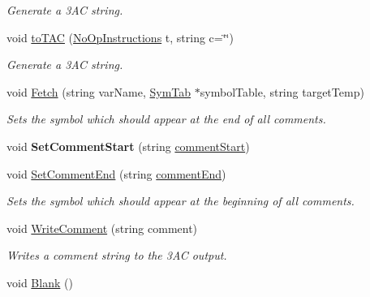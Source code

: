 \begin{DoxyCompactItemize}
\begin{DoxyCompactList}\small\item\em Generate a 3\-A\-C string. \end{DoxyCompactList}\item 
void \hyperlink{classTAC__Generator_a0ee1e11b169a2ead7244c00869d66858}{to\-T\-A\-C} (\hyperlink{classTAC__Generator_a3942f3e280fb83e44ad85eb13d56dfb5}{No\-Op\-Instructions} t, string c=\char`\"{}\char`\"{})
\begin{DoxyCompactList}\small\item\em Generate a 3\-A\-C string. \end{DoxyCompactList}\item 
void \hyperlink{classTAC__Generator_aacf5782b612a76a148478154306d3216}{Fetch} (string var\-Name, \hyperlink{classSymTab}{Sym\-Tab} $\ast$symbol\-Table, string target\-Temp)
\begin{DoxyCompactList}\small\item\em Sets the symbol which should appear at the end of all comments. \end{DoxyCompactList}\item 
\hypertarget{classTAC__Generator_a8570a01bd5bf10e849017d412440799a}{void {\bfseries Set\-Comment\-Start} (string \hyperlink{classTAC__Generator_ac530666b410f226e764e9eb33b2a4666}{comment\-Start})}\label{classTAC__Generator_a8570a01bd5bf10e849017d412440799a}

\item 
void \hyperlink{classTAC__Generator_ad96d5a262c29a34a34324ed6c7aeffe1}{Set\-Comment\-End} (string \hyperlink{classTAC__Generator_a9f011cfb810ea2cd01b31b9a48762123}{comment\-End})
\begin{DoxyCompactList}\small\item\em Sets the symbol which should appear at the beginning of all comments. \end{DoxyCompactList}\item 
void \hyperlink{classTAC__Generator_a37a03e11321195b25600eb008b20b800}{Write\-Comment} (string comment)
\begin{DoxyCompactList}\small\item\em Writes a comment string to the 3\-A\-C output. \end{DoxyCompactList}\item 
\hypertarget{classTAC__Generator_a3351d9d0d43b7b33591ed556c0261b84}{void \hyperlink{classTAC__Generator_a3351d9d0d43b7b33591ed556c0261b84}{Blank} ()}\label{classTAC__Generator_a3351d9d0d43b7b33591ed556c0261b84}


\end{DoxyCompactItemize}
